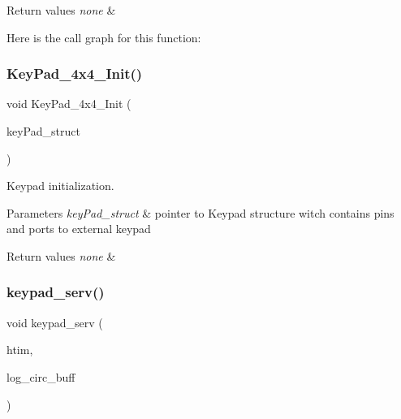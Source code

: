 \begin{DoxyRetVals}{Return values}
{\em none} & \\
\hline
\end{DoxyRetVals}
Here is the call graph for this function\+:
\mbox{\label{group___key_pad___functions_gab61c53c156f7de52d60558afe0b11216}} 
\subsubsection{\texorpdfstring{Key\+Pad\+\_\+4x4\+\_\+\+Init()}{KeyPad\_4x4\_Init()}}
{\footnotesize\ttfamily void Key\+Pad\+\_\+4x4\+\_\+\+Init (\begin{DoxyParamCaption}\item[{\hyperlink{struct_keypad___wires_type_def}{Keypad\+\_\+\+Wires\+Type\+Def} $\ast$}]{key\+Pad\+\_\+struct }\end{DoxyParamCaption})}



Keypad initialization. 


\begin{DoxyParams}{Parameters}
{\em key\+Pad\+\_\+struct} & pointer to Keypad structure witch contains pins and ports to external keypad \\
\hline
\end{DoxyParams}

\begin{DoxyRetVals}{Return values}
{\em none} & \\
\hline
\end{DoxyRetVals}
\mbox{\label{group___key_pad___functions_ga0d78ad3fd18fa45e674df471b530c3a2}} 
\subsubsection{\texorpdfstring{keypad\+\_\+serv()}{keypad\_serv()}}
{\footnotesize\ttfamily void keypad\+\_\+serv (\begin{DoxyParamCaption}\item[{T\+I\+M\+\_\+\+Handle\+Type\+Def $\ast$}]{htim,  }\item[{\hyperlink{structcirc__buffer__2d}{circ\+\_\+buffer\+\_\+2d} $\ast$}]{log\+\_\+circ\+\_\+buff }\end{DoxyParamCaption})}



